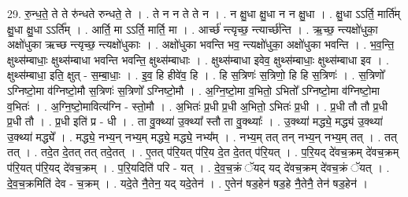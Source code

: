 \documentclass[17pt]{extarticle}
\begin{document}
29. रु॒न्ध॒ते॒ ते ते रु॑न्धते रुन्धते॒ ते । . ते न न ते ते न । . न क्षु॒धा क्षु॒धा न न क्षु॒धा । . क्षु॒धा ऽऽर्ति॒ मार्ति॑म् क्षु॒धा क्षु॒धा ऽऽर्ति᳚म् । . आर्ति॒ मा ऽऽर्ति॒ मार्ति॒ मा । . आर्च्छ॑ न्त्यृच्छ॒ न्त्यार्च्छ॑न्ति । . ऋ॒च्छ॒ न्त्यक्षो॑धुका॒ अक्षो॑धुका ऋच्छ न्त्यृच्छ॒ न्त्यक्षो॑धुकाः । . अक्षो॑धुका भवन्ति भव॒ न्त्यक्षो॑धुका॒ अक्षो॑धुका भवन्ति । . भ॒व॒न्ति॒ क्षुथ्स॑म्बाधाः॒ क्षुथ्स॑म्बाधा भवन्ति भवन्ति॒ क्षुथ्स॑म्बाधाः । . क्षुथ्स॑म्बाधा इवेव॒ क्षुथ्स॑म्बाधाः॒ क्षुथ्स॑म्बाधा इव । . क्षुथ्स॑म्बाधा॒ इति॒ क्षुत् - स॒म्बा॒धाः॒ । . इ॒व॒ हि हीवे॑व॒ हि । . हि स॒त्रिणः॑ स॒त्रिणो॒ हि हि स॒त्रिणः॑ । . स॒त्रिणो᳚ ऽग्निष्टो॒मा व॑ग्निष्टो॒मौ स॒त्रिणः॑ स॒त्रिणो᳚ ऽग्निष्टो॒मौ । . अ॒ग्नि॒ष्टो॒मा व॒भितो॒ ऽभितो᳚ ऽग्निष्टो॒मा व॑ग्निष्टो॒मा व॒भितः॑ । . अ॒ग्नि॒ष्टो॒मावित्य॑ग्नि - स्तो॒मौ । . अ॒भितः॑ प्र॒धी प्र॒धी अ॒भितो॒ ऽभितः॑ प्र॒धी । . प्र॒धी तौ तौ प्र॒धी प्र॒धी तौ । . प्र॒धी इति॑ प्र - धी । . ता वु॒क्थ्या॑ उ॒क्थ्या᳚ स्तौ ता वु॒क्थ्याः᳚ । . उ॒क्थ्या॑ मद्ध्ये॒ मद्ध्य॑ उ॒क्थ्या॑ उ॒क्थ्या॑ मद्ध्ये᳚ । . मद्ध्ये॒ नभ्य॒न् नभ्य॒म् मद्ध्ये॒ मद्ध्ये॒ नभ्य᳚म् । . नभ्य॒म् तत् तन् नभ्य॒न् नभ्य॒म् तत् । . तत् तत् । . तदे॒त दे॒तत् तत् तदे॒तत् । . ए॒तत् प॑रि॒यत् प॑रि॒य दे॒त दे॒तत् प॑रि॒यत् । . प॒रि॒यद् दे॑वच॒क्रम् दे॑वच॒क्रम् प॑रि॒यत् प॑रि॒यद् दे॑वच॒क्रम् । . प॒रि॒यदिति॑ परि - यत् । . दे॒व॒च॒क्रं ॅयद् यद् दे॑वच॒क्रम् दे॑वच॒क्रं ॅयत् । . दे॒व॒च॒क्रमिति॑ देव - च॒क्रम् । . यदे॒ते नै॒तेन॒ यद् यदे॒तेन॑ । . ए॒तेन॑ षड॒हेन॑ षड॒हे नै॒तेनै॒ तेन॑ षड॒हेन॑ । \newline
\end{document}
